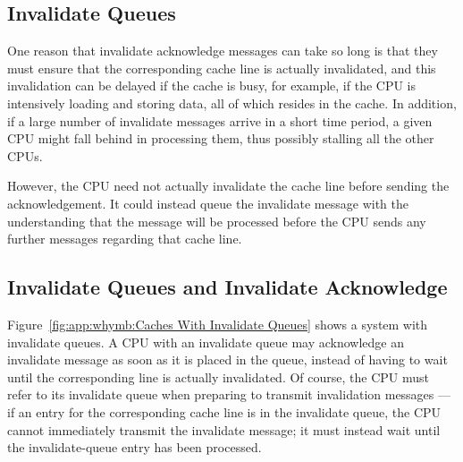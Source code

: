 \subsection{Invalidate Queues}
\label{sec:app:whymb:Invalidate Queues}

One reason that invalidate acknowledge messages can take so long
is that they must ensure that the corresponding cache line is
actually invalidated, and this invalidation can be delayed if
the cache is busy, for example, if the CPU is intensively loading
and storing data, all of which resides in the cache.
In addition, if a large number of invalidate messages arrive
in a short time period, a given CPU might fall behind in processing
them, thus possibly stalling all the other CPUs.

However, the CPU need not actually invalidate the cache line
before sending the acknowledgement.
It could instead queue the invalidate message with the understanding
that the message will be processed before the CPU sends any further
messages regarding that cache line.

\subsection{Invalidate Queues and Invalidate Acknowledge}
\label{sec:app:whymb:Invalidate Queues and Invalidate Acknowledge}

Figure~\ref{fig:app:whymb:Caches With Invalidate Queues}
shows a system with invalidate queues.
A CPU with an invalidate queue may acknowledge an invalidate message
as soon as it is placed in the queue, instead of having to wait until
the corresponding line is actually invalidated.
Of course, the CPU must refer to its invalidate queue when preparing
to transmit invalidation messages --- if an entry for the corresponding
cache line is in the invalidate queue, the CPU cannot immediately
transmit the invalidate message; it must instead wait until the
invalidate-queue entry has been processed.

